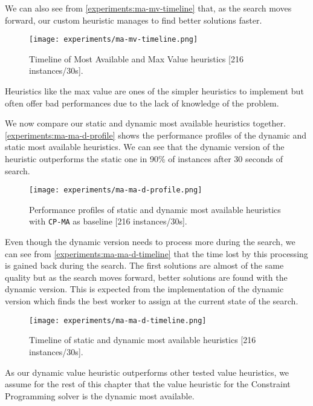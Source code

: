 \documentclass[../../thesis.tex]{subfiles}
\begin{document}
We can also see from \autoref{experiments:ma-mv-timeline} that, as the search moves forward, our custom heuristic manages to 
find better solutions faster.

\begin{figure}
  \centering
  \texttt{[image: experiments/ma-mv-timeline.png]}
  \caption{Timeline of Most Available and Max Value heuristics [216 instances/30s].}
  \label{experiments:ma-mv-timeline}
\end{figure}

Heuristics like the max value are ones of the simpler heuristics to implement but often offer bad performances due to 
the lack of knowledge of the problem.

\FloatBarrier

We now compare our static and dynamic most available heuristics together.
\autoref{experiments:ma-ma-d-profile} shows the performance profiles of the dynamic and static most available heuristics.
We can see that the dynamic version of the heuristic outperforms the static one in 90\% of instances after 30 seconds of search.

\begin{figure}
  \centering
  \texttt{[image: experiments/ma-ma-d-profile.png]}
  \caption{Performance profiles of static and dynamic most available heuristics with \texttt{CP-MA} as baseline [216 instances/30s].}
  \label{experiments:ma-ma-d-profile}
\end{figure}


Even though the dynamic version needs to process more during the search, we can see from \autoref{experiments:ma-ma-d-timeline} that the time lost 
by this processing is gained back during the search. The first solutions are almost of the same quality but 
as the search moves forward, better solutions are found with the dynamic version. 
This is expected from the implementation of the dynamic version which finds the best worker to assign 
at the current state of the search.

\begin{figure}
  \centering
  \texttt{[image: experiments/ma-ma-d-timeline.png]}
  \caption{Timeline of static and dynamic most available heuristics [216 instances/30s].}
  \label{experiments:ma-ma-d-timeline}
\end{figure}


\FloatBarrier

As our dynamic value heuristic outperforms other tested value heuristics, we assume for the rest of this chapter 
that the value heuristic for the Constraint Programming solver is the dynamic most available.
\end{document}
